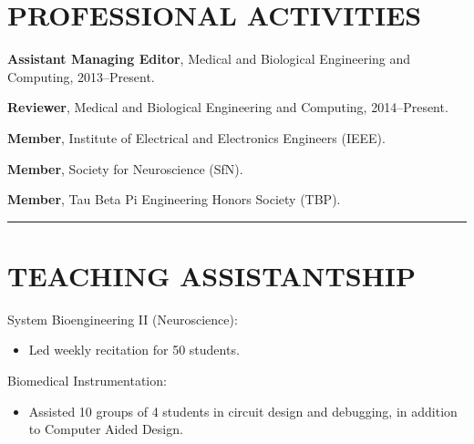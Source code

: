 \documentclass[margin]{res}
\begin{document}
\begin{resume}
%
%
%
%
%
%

\section{\MakeUppercase{Professional Activities}}

\textbf{Assistant Managing Editor}, Medical and Biological Engineering and Computing, 2013--Present.

\textbf{Reviewer}, Medical and Biological Engineering and Computing, 2014--Present.

\textbf{Member}, Institute of Electrical and Electronics Engineers (IEEE).

\textbf{Member}, Society for Neuroscience (SfN).

\textbf{Member}, Tau Beta Pi Engineering Honors Society (TBP).

\rule{\linewidth}{1mm}  %

\section{\MakeUppercase{Teaching Assistantship}}

System Bioengineering II (Neuroscience):
\begin{itemize}
	\item Led weekly recitation for 50 students.
\end{itemize}

Biomedical Instrumentation:
\begin{itemize}
	\item Assisted 10 groups of 4 students in circuit design and 
	debugging, in addition to Computer Aided Design.
\end{itemize}


\end{resume}
\end{document}
